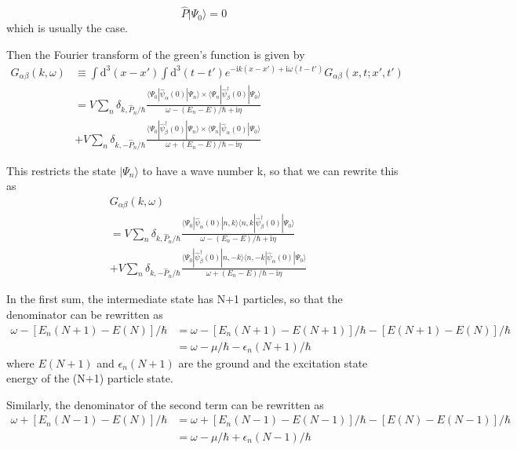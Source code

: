 \begin{equation}
\hat{P}|\Psi_0\rangle=0 \nonumber
\end{equation}
which is usually the case.

Then the Fourier transform of the green's function is given by
\begin{align}
G_{\alpha\beta}(k,\omega)&\equiv\int \mathrm{d}^3(x-x')\int \mathrm{d}^3(t-t')e^{-\mathrm{i}k(x-x')+\mathrm{i}\omega(t-t')}G_{\alpha\beta}(x,t;x',t') \nonumber \\
&=V\sum_n \delta_{k,\hat P_n/\hbar} \frac{\langle\Psi_0|\hat \psi_{\alpha}(0)|\Psi_n\rangle\times\langle\Psi_n|\hat \psi^{
\dagger}_{\beta} (0)|\Psi_0\rangle}{\omega-(E_n-E)/\hbar +\mathrm{i}\eta}  \nonumber \\
&+V\sum_n \delta_{k,-\hat P_n/\hbar} \frac{\langle\Psi_0|\hat \psi^{
\dagger}_{\beta} (0)|\Psi_n\rangle\times\langle\Psi_n|\hat \psi_{\alpha}(0)|\Psi_0\rangle}{\omega+(E_n-E)/\hbar -\mathrm{i}\eta}  \nonumber
\end{align}

This restricts the state $|\Psi_n\rangle$ to have a wave number k, so that we can rewrite this as
\begin{align}
& G_{\alpha\beta}(k,\omega) \nonumber \\
&=V\sum_n \delta_{k,\hat P_n/\hbar} \frac{\langle\Psi_0|\hat \psi_{\alpha}(0)|n,k\rangle\langle n,k|\hat \psi^{
\dagger}_{\beta} (0)|\Psi_0\rangle}{\omega-(E_n-E)/\hbar +\mathrm{i}\eta}  \nonumber \\
&+V\sum_n \delta_{k,-\hat P_n/\hbar} \frac{\langle\Psi_0|\hat \psi^{
\dagger}_{\beta} (0)|n,-k\rangle\langle n,-k|\hat \psi_{\alpha}(0)|\Psi_0\rangle}{\omega+(E_n-E)/\hbar -\mathrm{i}\eta}  \nonumber
\end{align}

In the first sum, the intermediate state has N+1 particles, so that the denominator can be rewritten as
\begin{align}
\omega-[E_n(N+1)-E(N)]/\hbar &= \omega-[E_n(N+1)-E(N+1)]/\hbar-[E(N+1)-E(N)]/\hbar \nonumber \\
&=\omega-\mu/\hbar-\epsilon_n(N+1)/\hbar \nonumber
\end{align}
where $E(N+1)$ and $\epsilon_n(N+1)$ are the ground and the excitation state energy of the (N+1) particle state.

Similarly, the denominator of the second term can be rewritten as 
\begin{align}
\omega+[E_n(N-1)-E(N)]/\hbar &= \omega+[E_n(N-1)-E(N-1)]/\hbar-[E(N)-E(N-1)]/\hbar \nonumber \\
&=\omega-\mu/\hbar+\epsilon_n(N-1)/\hbar \nonumber
\end{align}

